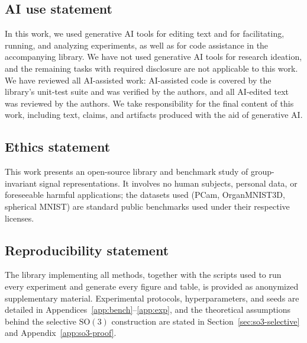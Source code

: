 \documentclass{article}
\theoremstyle{definition}
\theoremstyle{remark}
\newcommand{\SO}{\mathrm{SO}}
\theoremstyle{definition}
\begin{document}

\label{marker:end-main-text}%
\subsection*{AI use statement}
In this work, we used generative AI tools for editing text and for
facilitating, running, and analyzing experiments, as well as for code
assistance in the accompanying library. We have not used generative AI
tools for research ideation, and the remaining tasks with required
disclosure are not applicable to this work. We have reviewed all
AI-assisted work: AI-assisted code is covered by the library's unit-test
suite and was verified by the authors, and all AI-edited text was
reviewed by the authors. We take responsibility for the final content of
this work, including text, claims, and artifacts produced with the aid
of generative AI.

\subsection*{Ethics statement}
This work presents an open-source library and benchmark study of
group-invariant signal representations. It involves no human subjects,
personal data, or foreseeable harmful applications; the datasets used
(PCam, OrganMNIST3D, spherical MNIST) are standard public benchmarks
used under their respective licenses.

\subsection*{Reproducibility statement}
The library implementing all methods, together with the scripts used to
run every experiment and generate every figure and table, is provided as
anonymized supplementary material. Experimental protocols,
hyperparameters, and seeds are detailed in
Appendices~\ref{app:bench}--\ref{app:exp}, and the theoretical
assumptions behind the selective $\SO(3)$ construction are stated in
Section~\ref{sec:so3-selective} and Appendix~\ref{app:so3-proof}.



\end{document}
